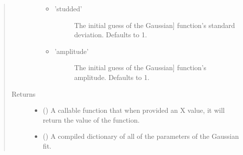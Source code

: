 \documentclass[letterpaper,10pt,english]{sphinxmanual}
\begin{document}
\begin{fulllineitems}
\begin{quote}
\begin{description}
\begin{itemize}
\begin{itemize}
\begin{description}
\end{description}

\item {} \begin{description}
\item[{’studded’}] \leavevmode{[}The initial guess of the Gaussian{]}
function’s standard deviation.
Defaults to 1.

\end{description}

\item {} \begin{description}
\item[{’amplitude’}] \leavevmode{[}The initial guess of the Gaussian{]}
function’s  amplitude. Defaults to 1.

\end{description}

\end{itemize}


\end{itemize}

\item[{Returns}] \leavevmode
\begin{itemize}
\item {} 
 () \textendash{} A callable function that when provided an X value, it
will return the value of the function.

\item {} 
 () \textendash{} A compiled dictionary of all of the parameters of the
Gaussian fit.

\end{itemize}


\end{description}\end{quote}

\end{fulllineitems}

\end{document}
